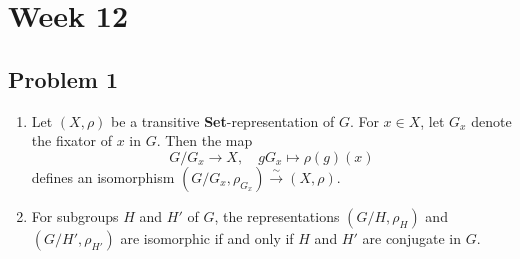 \section{Week 12}
\subsection*{Problem 1}
\begin{enumerate}
    \item[(i)] Let $(X, \rho)$ be a transitive \textbf{Set}-representation of $G$. For $x \in X$, let $G_x$ denote the fixator of $x$ in $G$. Then the map
    $$
    G/G_x \to X, \quad gG_x \mapsto \rho(g)(x)
    $$
    defines an isomorphism $(G/G_x, \rho_{G_x}) \xrightarrow{\sim} (X, \rho)$.
    \item[(ii)] For subgroups $H$ and $H'$ of $G$, the representations $(G/H, \rho_H)$ and $(G/H', \rho_{H'})$ are isomorphic if and only if $H$ and $H'$ are conjugate in $G$.
\end{enumerate}

